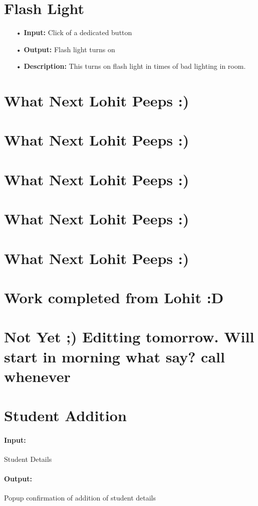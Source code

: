 \section{Flash Light}
\begin{enumerate}
\item[•] \textbf{Input:} Click of a dedicated button
\item[•] \textbf{Output:} Flash light turns on
\item[•] \textbf{Description:} This turns on flash light in times of bad lighting in room.
\end{enumerate}

\section{What Next Lohit Peeps :)}
\section{What Next Lohit Peeps :)}
\section{What Next Lohit Peeps :)}
\section{What Next Lohit Peeps :)}
\section{What Next Lohit Peeps :)}
\section{Work completed from Lohit :D }
\section{Not Yet ;) Editting tomorrow. Will start in morning what say? call whenever}


\section{Student Addition}

\paragraph{Input:}
Student Details
\paragraph{Output:}
Popup confirmation of addition of student details
